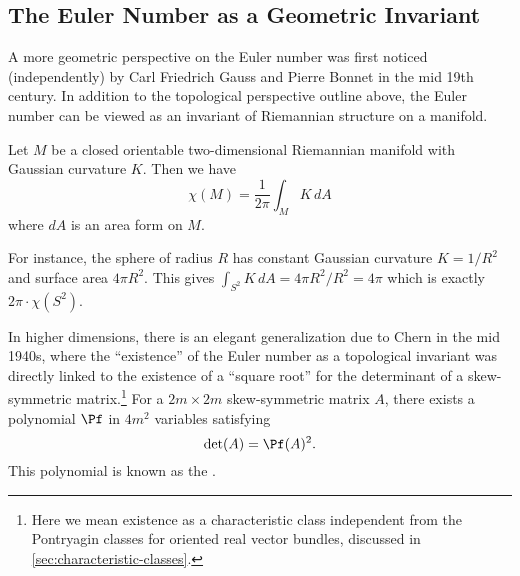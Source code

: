 \subsection{The Euler Number as a Geometric Invariant}\label{sec:euler-number-geometric}

A more geometric perspective on the Euler number was first noticed (independently) by Carl Friedrich Gauss and Pierre Bonnet in the mid 19th century. In addition to the topological perspective outline above, the Euler number can be viewed as an invariant of Riemannian structure on a manifold.

\begin{theorem}
  Let $M$ be a closed orientable two-dimensional Riemannian manifold with Gaussian curvature $K$. Then we have
  \[
    \chi(M) = \frac{1}{2\pi}\int_M K\,dA
  \]
  where $dA$ is an area form on $M$.
\end{theorem}
For instance, the sphere of radius $R$ has constant Gaussian curvature $K=1/R^2$ and surface area $4\pi R^2$. This gives $\int_{S^2}K\,dA =4\pi R^2/R^2=4\pi$ which is exactly $2\pi\cdot \chi(S^2)$.

In higher dimensions, there is an elegant generalization due to Chern in the mid 1940s, where the ``existence'' of the Euler number as a topological invariant was directly linked to the existence of a ``square root'' for the determinant of a skew-symmetric matrix.\footnote{Here we mean existence as a characteristic class independent from the Pontryagin classes for oriented real vector bundles, discussed in \cref{sec:characteristic-classes}.} For a $2m\times 2m$ skew-symmetric matrix $A$, there exists a polynomial $\Pf$ in $4m^2$ variables satisfying \[\det(A) = \Pf(A)^2.\] This polynomial is known as the .

